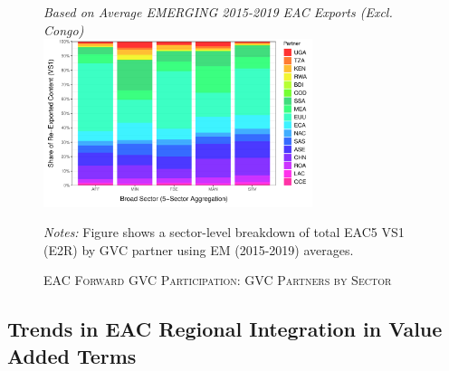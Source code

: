 \documentclass[a4paper]{article}
\begin{document}
\begin{figure}[h!] 
\centering
\caption{\label{fig:EACVS1_ctry_sec}\textsc{EAC Forward GVC Participation: GVC Partners by Sector}}
\small{\textit{Based on Average EMERGING 2015-2019 EAC Exports (Excl. Congo)}} \\
\vspace{1mm}
\includegraphics[width=0.7\textwidth]{"Figures/VS1_shares_sec_ctry.pdf"} \\ \raggedright
\scriptsize
\vspace{-1mm}
\emph{Notes:} Figure shows a sector-level breakdown of total EAC5 VS1 (E2R) by GVC partner using EM (2015-2019) averages. %
\end{figure}
\FloatBarrier



\subsection{Trends in EAC Regional Integration in Value Added Terms}
\end{document}
